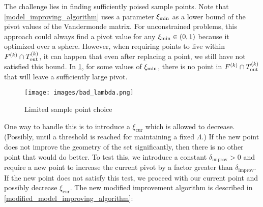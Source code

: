 The challenge lies in finding sufficiently poised sample points.
Note that \cref{model_improving_algorithm} uses a parameter $  \xi_{\text{min}} $ as a lower bound of the pivot values of the Vandermonde matrix.
For unconstrained problems, this approach could always find a pivot value for any $ \xi_{\text{min}} \in (0,1)$ because it optimized over a sphere.
However, when requiring points to live within $ {F}^{(k)} \cap {T_{\text{out}}^{(k)}} $, it can happen that even after replacing a point, we still have not satisfied this bound.
In \cref{lspc}, for some values of $  \xi_{\text{min}} $, there is no point in $ {F}^{(k)} \cap {T_{\text{out}}^{(k)}} $ that will leave a sufficiently large pivot.

\begin{figure}[h]
    \centering
    \texttt{[image: images/bad\_lambda.png]}
    \caption{Limited sample point choice}
    \label{lspc}
\end{figure}
 

One way to handle this is to introduce a $\xi_{\text{cur}}$ which is allowed to decrease.
(Possibly, until a threshold is reached for maintaining a fixed $\Lambda$.)
If the new point does not improve the geometry of the set significantly, then there is no other point that would do better.
To test this, we introduce a constant $\delta_{\text{improv}}>0$ and require a new point to increase the current pivot by a factor greater than $\delta_{\text{improv}}$.
If the new point does not satisfy this test, we proceed with our current point and possibly decrease $\xi_{\text{cur}}$.
The new modified improvement algorithm is described in \cref{modified_model_improving_algorithm}:

